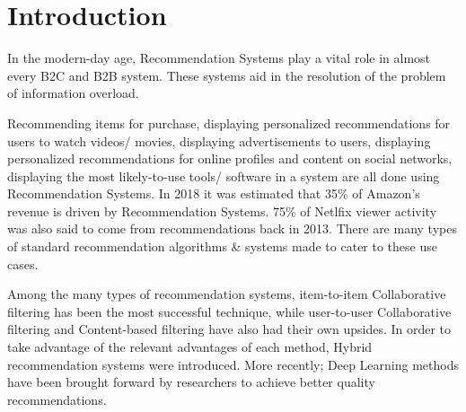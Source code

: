 \documentclass[manuscript,screen,review]{acmart}
\begin{document}



\maketitle

\section{Introduction}
In the modern-day age, Recommendation Systems play a vital role in almost every B2C and B2B system. These systems aid in the resolution of the problem of information overload.

Recommending items for purchase, displaying personalized recommendations for users to watch videos/ movies, displaying advertisements to users, displaying personalized recommendations for online profiles and content on social networks, displaying the most likely-to-use tools/ software in a system are all done using Recommendation Systems. In 2018 it was estimated that 35\% of Amazon's revenue \cite{naumov_deep_2019} is driven by Recommendation Systems. 75\% of Netlfix viewer activity \cite{vanderbilt_science_nodate} was also said to come from recommendations back in 2013. There are many types of standard recommendation algorithms \& systems made to cater to these use cases. 

Among the many types of recommendation systems, item-to-item Collaborative filtering has been the most successful technique, while user-to-user Collaborative filtering and Content-based filtering have also had their own upsides. In order to take advantage of the relevant advantages of each method, Hybrid recommendation systems were introduced. More recently; Deep Learning methods have been brought forward by researchers to achieve better quality recommendations.
\end{document}
